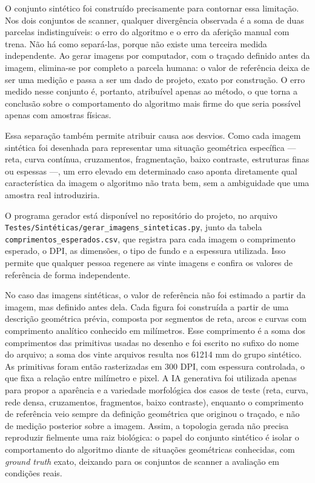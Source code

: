 \documentclass[12pt]{article}
\begin{document}
O conjunto sintético foi construído precisamente para contornar essa limitação. Nos dois conjuntos de scanner, qualquer divergência observada é a soma de duas parcelas indistinguíveis: o erro do algoritmo e o erro da aferição manual com trena. Não há como separá-las, porque não existe uma terceira medida independente. Ao gerar imagens por computador, com o traçado definido antes da imagem, elimina-se por completo a parcela humana: o valor de referência deixa de ser uma medição e passa a ser um dado de projeto, exato por construção. O erro medido nesse conjunto é, portanto, atribuível apenas ao método, o que torna a conclusão sobre o comportamento do algoritmo mais firme do que seria possível apenas com amostras físicas.

Essa separação também permite atribuir causa aos desvios. Como cada imagem sintética foi desenhada para representar uma situação geométrica específica — reta, curva contínua, cruzamentos, fragmentação, baixo contraste, estruturas finas ou espessas —, um erro elevado em determinado caso aponta diretamente qual característica da imagem o algoritmo não trata bem, sem a ambiguidade que uma amostra real introduziria.

O programa gerador está disponível no repositório do projeto, no arquivo \texttt{Testes/Sintéticas/gerar\_imagens\_sinteticas.py}, junto da tabela \texttt{comprimentos\_esperados.csv}, que registra para cada imagem o comprimento esperado, o DPI, as dimensões, o tipo de fundo e a espessura utilizada. Isso permite que qualquer pessoa regenere as vinte imagens e confira os valores de referência de forma independente.

No caso das imagens sintéticas, o valor de referência não foi estimado a partir da imagem, mas definido antes dela. Cada figura foi construída a partir de uma descrição geométrica prévia, composta por segmentos de reta, arcos e curvas com comprimento analítico conhecido em milímetros. Esse comprimento é a soma dos comprimentos das primitivas usadas no desenho e foi escrito no sufixo do nome do arquivo; a soma dos vinte arquivos resulta nos 61214 mm do grupo sintético. As primitivas foram então rasterizadas em 300 DPI, com espessura controlada, o que fixa a relação entre milímetro e pixel. A IA generativa foi utilizada apenas para propor a aparência e a variedade morfológica dos casos de teste (reta, curva, rede densa, cruzamentos, fragmentos, baixo contraste), enquanto o comprimento de referência veio sempre da definição geométrica que originou o traçado, e não de medição posterior sobre a imagem. Assim, a topologia gerada não precisa reproduzir fielmente uma raiz biológica: o papel do conjunto sintético é isolar o comportamento do algoritmo diante de situações geométricas conhecidas, com \textit{ground truth} exato, deixando para os conjuntos de scanner a avaliação em condições reais.
\end{document}
